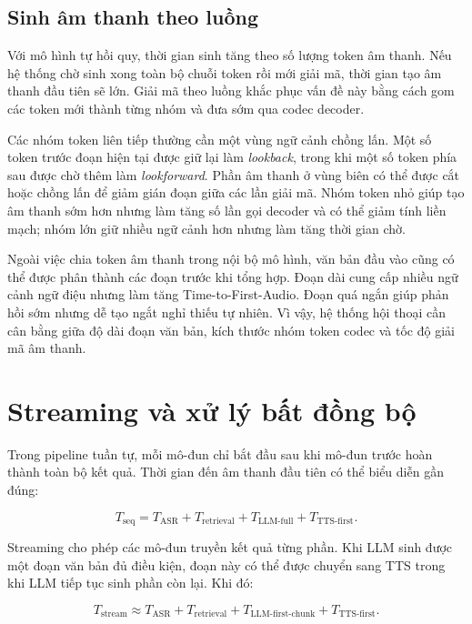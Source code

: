 \documentclass[a4paper,13pt,oneside]{report}
\begin{document}
\subsection{Sinh âm thanh theo luồng}

Với mô hình tự hồi quy, thời gian sinh tăng theo số lượng token âm thanh. Nếu hệ thống chờ sinh xong toàn bộ chuỗi token rồi mới giải mã, thời gian tạo âm thanh đầu tiên sẽ lớn. Giải mã theo luồng khắc phục vấn đề này bằng cách gom các token mới thành từng nhóm và đưa sớm qua codec decoder.

Các nhóm token liên tiếp thường cần một vùng ngữ cảnh chồng lấn. Một số token trước đoạn hiện tại được giữ lại làm \textit{lookback}, trong khi một số token phía sau được chờ thêm làm \textit{lookforward}. Phần âm thanh ở vùng biên có thể được cắt hoặc chồng lấn để giảm gián đoạn giữa các lần giải mã. Nhóm token nhỏ giúp tạo âm thanh sớm hơn nhưng làm tăng số lần gọi decoder và có thể giảm tính liền mạch; nhóm lớn giữ nhiều ngữ cảnh hơn nhưng làm tăng thời gian chờ.

Ngoài việc chia token âm thanh trong nội bộ mô hình, văn bản đầu vào cũng có thể được phân thành các đoạn trước khi tổng hợp. Đoạn dài cung cấp nhiều ngữ cảnh ngữ điệu nhưng làm tăng Time-to-First-Audio. Đoạn quá ngắn giúp phản hồi sớm nhưng dễ tạo ngắt nghỉ thiếu tự nhiên. Vì vậy, hệ thống hội thoại cần cân bằng giữa độ dài đoạn văn bản, kích thước nhóm token codec và tốc độ giải mã âm thanh.

\section{Streaming và xử lý bất đồng bộ}

Trong pipeline tuần tự, mỗi mô-đun chỉ bắt đầu sau khi mô-đun trước hoàn thành toàn bộ kết quả. Thời gian đến âm thanh đầu tiên có thể biểu diễn gần đúng:

\begin{equation}
    T_{\mathrm{seq}}
    =
    T_{\mathrm{ASR}}
    + T_{\mathrm{retrieval}}
    + T_{\mathrm{LLM\text{-}full}}
    + T_{\mathrm{TTS\text{-}first}}.
\end{equation}

Streaming cho phép các mô-đun truyền kết quả từng phần. Khi LLM sinh được một đoạn văn bản đủ điều kiện, đoạn này có thể được chuyển sang TTS trong khi LLM tiếp tục sinh phần còn lại. Khi đó:

\begin{equation}
    T_{\mathrm{stream}}
    \approx
    T_{\mathrm{ASR}}
    + T_{\mathrm{retrieval}}
    + T_{\mathrm{LLM\text{-}first\text{-}chunk}}
    + T_{\mathrm{TTS\text{-}first}}.
\end{equation}
\end{document}
